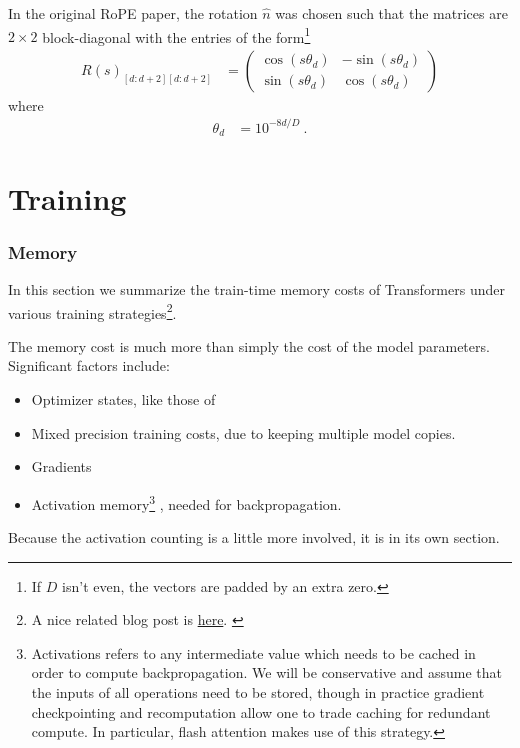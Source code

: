 \documentclass[11pt]{article}
\begin{document}
In the original RoPE paper, the rotation $ \hat{n} $ was chosen such that the matrices are $ 2
	\times  2 $ block-diagonal with the entries of the form\footnote{If $ D $ isn't even, the vectors
	are padded by an extra zero.}
\begin{align}
	R(s)_{ [d:d+2][d:d+2] } & =\begin{pmatrix}
		                           \cos \left ( s \theta _{ d }   \right ) & -\sin \left ( s \theta _{ d }   \right ) \\
		                           \sin \left ( s \theta _{ d }   \right ) & \cos \left ( s \theta _{ d }   \right )
	                           \end{pmatrix}
\end{align}
where
\begin{align}
	\theta _{ d } & = 10 ^{ -8d/D   } \ .
\end{align}





\part{Training}

\section{Memory \label{sec_memory_training}}

In this section we summarize the train-time memory costs of Transformers under various training
strategies\footnote{A nice related blog post is \href{https://blog.eleuther.ai/transformer-math/}{here}. \label{foot_eleuther_math_101} }.

The memory cost is much more than simply the cost of the model
parameters. Significant factors include:
\begin{itemize}
	\item Optimizer states, like those of 
	\item Mixed precision training costs, due to keeping multiple model copies.
	\item Gradients
	\item Activation memory\footnote{Activations refers to any intermediate value which needs to be
		      cached in order to compute backpropagation. We will be conservative and assume that the inputs
		      of all operations need to be stored, though in practice gradient checkpointing and recomputation
		      allow one to trade caching for redundant compute. In particular, flash attention
		      \cite{dao2022flashattention} makes use of this strategy.} , needed for backpropagation.
\end{itemize}
Because the activation counting is a little more involved, it is in its own section.
\end{document}
